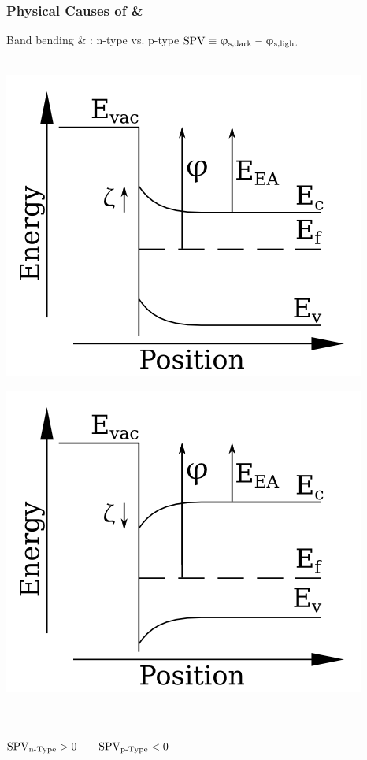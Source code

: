 \documentclass{beamer}
\begin{document}
\begin{frame}
\frametitle{Physical Causes of \cpd{} \& \spv{}}
\begin{block}{Band bending \& \spv{}: n-type vs. p-type}
\centering
$\text{SPV} \equiv \upvarphi _{\text{s,dark}} - \upvarphi _{\text{s,light}}$\\[-8pt]\hrulefill\\[-5pt]
\begin{minipage}{0.45\linewidth}
\centering
	\includegraphics[width=0.9\linewidth]{./figs/pres/bbdefn}
\end{minipage}
\hfill
\begin{minipage}{0.45\linewidth}
\centering
	\includegraphics[width=0.9\linewidth]{./figs/pres/bbdefp}
\end{minipage}\\\hrulefill\\
$\text{SPV}_{\text{n-Type}} 	> 0	\qquad	\text{SPV}_{\text{p-Type}} 	< 0	$
\end{block}\end{frame}
\end{document}
